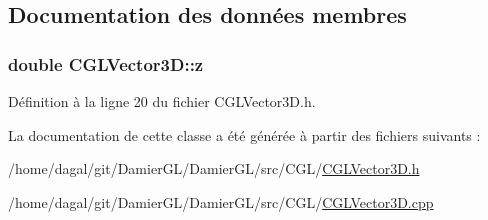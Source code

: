 \subsection{Documentation des données membres}
\hypertarget{class_c_g_l_vector3_d_af16926d21ef4bddbc2524d2604e049b3}{
\subsubsection[{z}]{\setlength{\rightskip}{0pt plus 5cm}double C\-G\-L\-Vector3\-D\-::z\hspace{0.3cm}{\ttfamily [protected]}}}\label{class_c_g_l_vector3_d_af16926d21ef4bddbc2524d2604e049b3}


Définition à la ligne 20 du fichier C\-G\-L\-Vector3\-D.\-h.



La documentation de cette classe a été générée à partir des fichiers suivants \-:\begin{DoxyCompactItemize}
\item 
/home/dagal/git/\-Damier\-G\-L/\-Damier\-G\-L/src/\-C\-G\-L/\hyperlink{_c_g_l_vector3_d_8h}{C\-G\-L\-Vector3\-D.\-h}\item 
/home/dagal/git/\-Damier\-G\-L/\-Damier\-G\-L/src/\-C\-G\-L/\hyperlink{_c_g_l_vector3_d_8cpp}{C\-G\-L\-Vector3\-D.\-cpp}\end{DoxyCompactItemize}
